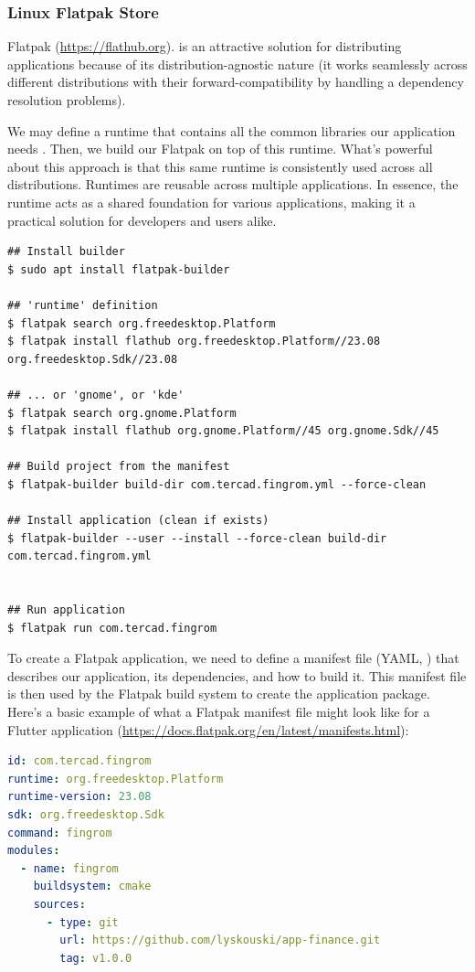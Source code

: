 \subsubsection{Linux Flatpak Store}

Flatpak (\href{https://flathub.org}{https://flathub.org}). is an attractive solution for distributing applications 
because of its distribution-agnostic nature (it works seamlessly across different distributions with their 
forward-compatibility by handling a dependency resolution problems).

We may define a runtime that contains all the common libraries our application needs . Then, we build our 
Flatpak on top of this runtime. What's powerful about this approach is that this same runtime is consistently used 
across all distributions. Runtimes are reusable across multiple applications. In essence, the runtime acts as a 
shared foundation for various applications, making it a practical solution for developers and users alike. 

\begin{lstlisting}[language=terminal]
## Install builder
$ sudo apt install flatpak-builder

## 'runtime' definition
$ flatpak search org.freedesktop.Platform
$ flatpak install flathub org.freedesktop.Platform//23.08 org.freedesktop.Sdk//23.08

## ... or 'gnome', or 'kde'
$ flatpak search org.gnome.Platform
$ flatpak install flathub org.gnome.Platform//45 org.gnome.Sdk//45

## Build project from the manifest
$ flatpak-builder build-dir com.tercad.fingrom.yml --force-clean

## Install application (clean if exists)
$ flatpak-builder --user --install --force-clean build-dir com.tercad.fingrom.yml


## Run application
$ flatpak run com.tercad.fingrom
\end{lstlisting}

\noindent To create a Flatpak application, we need to define a manifest file (YAML, ) that 
describes our application, its dependencies, and how to build it. This manifest file is then used by the Flatpak build 
system to create the application package. Here's a basic example of what a Flatpak manifest file might look like for a 
Flutter application (\href{https://docs.flatpak.org/en/latest/manifests.html}{https://docs.flatpak.org/en/latest/manifests.html}):

\begin{lstlisting}[language=yaml]
id: com.tercad.fingrom
runtime: org.freedesktop.Platform
runtime-version: 23.08
sdk: org.freedesktop.Sdk
command: fingrom
modules:
  - name: fingrom
    buildsystem: cmake
    sources:
      - type: git
        url: https://github.com/lyskouski/app-finance.git
        tag: v1.0.0
\end{lstlisting}

